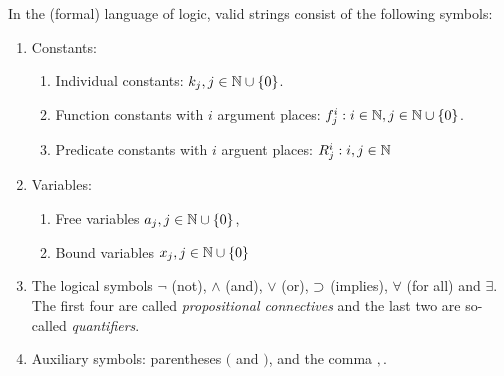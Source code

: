 \documentclass[11pt,a4paper]{article}
\begin{document}
\begin{definition}%
    \label{def:classical alphabet}
    In the (formal) language of logic, valid strings consist of the following symbols:
    \begin{enumerate}
        \item\label{it:classical constants} Constants:
            \begin{enumerate}
                \item\label{it:classical constants individual}
                    Individual constants: \(k_j, j\in\mathbb{N}\cup\{0\}\).
                \item\label{it:classical constants function}
                    Function constants with \(i\) argument places: \(f_j^i : i\in\mathbb{N},j\in\mathbb{N}\cup\{0\}\).
                \item\label{it:classical constants predicates}
                    Predicate constants with \(i\) arguent places: \(R_j^i : i, j\in\mathbb{N}\)
            \end{enumerate}
        \item\label{it:classical variables} Variables:
            \begin{enumerate}
                \item\label{it:classical variables free} Free variables \(a_j, j\in\mathbb{N}\cup\{0\}\),
                \item\label{it:classical variables bound} Bound variables \(x_j, j\in\mathbb{N}\cup\{0\}\)
            \end{enumerate}
        \item\label{it:classical logical symbols} The logical symbols \(\lnot\) (not), \(\land\) (and), \(\lor\) (or), \(\supset\) (implies),
            \(\forall\) (for all) and \(\exists\). The first four are called \emph{propositional connectives}
            and the last two are so-called \emph{quantifiers}.
        \item\label{it:classical auciliary symbols} Auxiliary symbols: parentheses \((\) and \()\), and the comma \(,\).
    \end{enumerate}
\end{definition}
\end{document}
